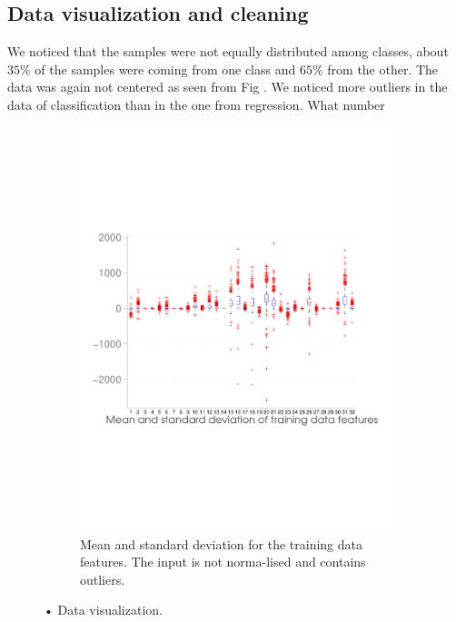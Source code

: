 \documentclass{article} %
\begin{document}
\subsection{Data visualization and cleaning}
We noticed that the samples were not equally distributed among classes, about $35\%$ of the samples were coming from one class and $65\%$ from the other. The data was again not centered as seen from Fig .
We noticed more outliers in the data of classification than in the one from regression. What number
{%
\begin{figure}[h]
  \begin{subfigure}[b]{0.7\textwidth}
   \includegraphics[width=\textwidth]{figures/ClassificationDistr.pdf}
    \caption{Mean and standard deviation for the training data features. The input is not norma-\newline lised and contains outliers.}
    \label{fig:dist_classification}
  \end{subfigure}
  \caption{• Data visualization. }
\end{figure}

}
\end{document}
